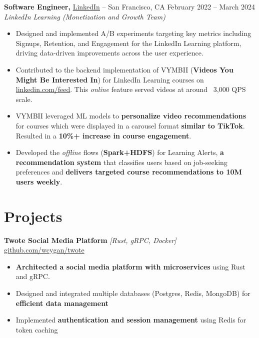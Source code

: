 \documentclass[10pt]{article}
\begin{document}
\vspace{5pt}

\textbf{Software Engineer,} \href{https://www.linkedin.com/}{LinkedIn} -- San Francisco, CA \hfill February 2022 -- March 2024 \\
{\small\textit{LinkedIn Learning (Monetization and Growth Team)}}
\vspace{1pt}
\begin{itemize}
    \item Designed and implemented A/B experiments targeting key metrics including Signups, Retention, and Engagement for the LinkedIn Learning platform, driving data-driven improvements across the user experience.
  \item Contributed to the backend implementation of VYMBII (\textbf{Videos You Might Be Interested In}) for LinkedIn Learning courses on \href{https://linkedin.com/feed}{linkedin.com/feed}. This \textit{online} feature served videos at around ~3,000 QPS scale.
  \item VYMBII leveraged ML models to \textbf{personalize video recommendations} for courses which were displayed in a carousel format \textbf{similar to TikTok}. Resulted in a \textbf{10\%+ increase in course engagement}.
  \item Developed the \textit{offline} flows (\textbf{Spark+HDFS}) for Learning Alerts, \textbf{a recommendation system} that classifies users based on job-seeking preferences and \textbf{delivers targeted course recommendations to 10M users weekly}. 
\end{itemize}

\vspace{5pt}

\section*{Projects}
\vspace{4pt}
\textbf{Twote Social Media Platform} \textit{[Rust, gRPC, Docker]} \hfill \href{https://github.com/wcygan/twote}{github.com/wcygan/twote}
\vspace{-4pt}
\begin{itemize}
  \item \textbf{Architected a social media platform with microservices} using Rust and gRPC.
  \item Designed and integrated multiple databases (Postgres, Redis, MongoDB) for \textbf{efficient data management}
  \item Implemented \textbf{authentication and session management} using Redis for token caching
\end{itemize}
\end{document}
